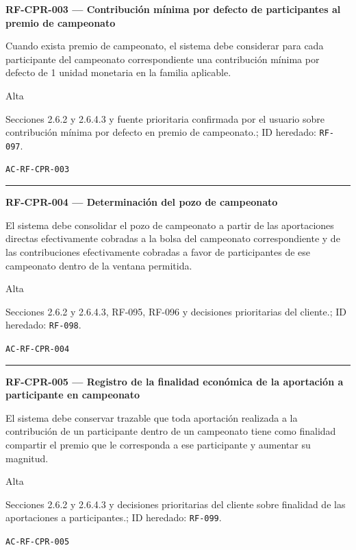\documentclass[10pt,letterpaper]{article}
\begin{document}
\noindent\textbf{RF-CPR-003 --- Contribución mínima por defecto de participantes al premio de campeonato}\par
\begin{description}[style=nextline,leftmargin=3.15cm,labelwidth=2.8cm,font=\normalfont\bfseries]
\item[Obligación] Cuando exista premio de campeonato, el sistema debe considerar para cada participante del campeonato correspondiente una contribución mínima por defecto de 1 unidad monetaria en la familia aplicable.
\item[Prioridad] Alta
\item[Procedencia] Secciones 2.6.2 y 2.6.4.3 y fuente prioritaria confirmada por el usuario sobre contribución mínima por defecto en premio de campeonato.; ID heredado: \texttt{RF-097}.
\item[Verificación] \texttt{AC-RF-CPR-003}
\end{description}
\vspace{0.25em}\hrule\vspace{0.65em}
\noindent\textbf{RF-CPR-004 --- Determinación del pozo de campeonato}\par
\begin{description}[style=nextline,leftmargin=3.15cm,labelwidth=2.8cm,font=\normalfont\bfseries]
\item[Obligación] El sistema debe consolidar el pozo de campeonato a partir de las aportaciones directas efectivamente cobradas a la bolsa del campeonato correspondiente y de las contribuciones efectivamente cobradas a favor de participantes de ese campeonato dentro de la ventana permitida.
\item[Prioridad] Alta
\item[Procedencia] Secciones 2.6.2 y 2.6.4.3, RF-095, RF-096 y decisiones prioritarias del cliente.; ID heredado: \texttt{RF-098}.
\item[Verificación] \texttt{AC-RF-CPR-004}
\end{description}
\vspace{0.25em}\hrule\vspace{0.65em}
\noindent\textbf{RF-CPR-005 --- Registro de la finalidad económica de la aportación a participante en campeonato}\par
\begin{description}[style=nextline,leftmargin=3.15cm,labelwidth=2.8cm,font=\normalfont\bfseries]
\item[Obligación] El sistema debe conservar trazable que toda aportación realizada a la contribución de un participante dentro de un campeonato tiene como finalidad compartir el premio que le corresponda a ese participante y aumentar su magnitud.
\item[Prioridad] Alta
\item[Procedencia] Secciones 2.6.2 y 2.6.4.3 y decisiones prioritarias del cliente sobre finalidad de las aportaciones a participantes.; ID heredado: \texttt{RF-099}.
\item[Verificación] \texttt{AC-RF-CPR-005}
\end{description}
\end{document}
